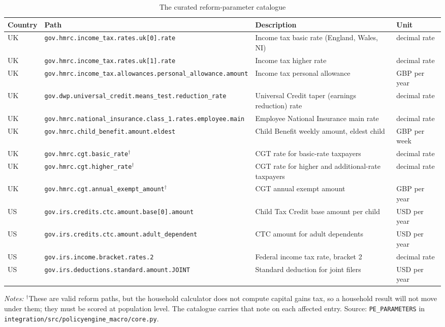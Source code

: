 \begin{table}[ht]
\centering
\caption{The curated reform-parameter catalogue}
\label{tab:params}
\small
\begin{tabular}{llp{4.4cm}l}
\toprule
Country & Path & Description & Unit \\
\midrule
UK & \texttt{gov.hmrc.income\_tax.\allowbreak rates.uk[0].rate} & Income tax basic rate (England, Wales, NI) & decimal rate \\
UK & \texttt{gov.hmrc.income\_tax.\allowbreak rates.uk[1].rate} & Income tax higher rate & decimal rate \\
UK & \texttt{gov.hmrc.income\_tax.\allowbreak allowances.personal\_\allowbreak allowance.amount} & Income tax personal allowance & GBP per year \\
UK & \texttt{gov.dwp.universal\_credit.\allowbreak means\_test.reduction\_rate} & Universal Credit taper (earnings reduction) rate & decimal rate \\
UK & \texttt{gov.hmrc.national\_\allowbreak insurance.class\_1.rates.\allowbreak employee.main} & Employee National Insurance main rate & decimal rate \\
UK & \texttt{gov.hmrc.child\_benefit.\allowbreak amount.eldest} & Child Benefit weekly amount, eldest child & GBP per week \\
UK & \texttt{gov.hmrc.cgt.basic\_rate}$^{\dagger}$ & CGT rate for basic-rate taxpayers & decimal rate \\
UK & \texttt{gov.hmrc.cgt.higher\_rate}$^{\dagger}$ & CGT rate for higher and additional-rate taxpayers & decimal rate \\
UK & \texttt{gov.hmrc.cgt.annual\_\allowbreak exempt\_amount}$^{\dagger}$ & CGT annual exempt amount & GBP per year \\
US & \texttt{gov.irs.credits.ctc.\allowbreak amount.base[0].amount} & Child Tax Credit base amount per child & USD per year \\
US & \texttt{gov.irs.credits.ctc.\allowbreak amount.adult\_dependent} & CTC amount for adult dependents & USD per year \\
US & \texttt{gov.irs.income.bracket.\allowbreak rates.2} & Federal income tax rate, bracket 2 & decimal rate \\
US & \texttt{gov.irs.deductions.\allowbreak standard.amount.JOINT} & Standard deduction for joint filers & USD per year \\
\bottomrule
\end{tabular}

\medskip
\parbox{0.94\textwidth}{\footnotesize \emph{Notes:} $^{\dagger}$These are valid reform paths, but the household calculator does not compute capital gains tax, so a household result will not move under them; they must be scored at population level. The catalogue carries that note on each affected entry. Source: \texttt{PE\_PARAMETERS} in \texttt{integration/src/policyengine\_macro/core.py}.}
\end{table}

